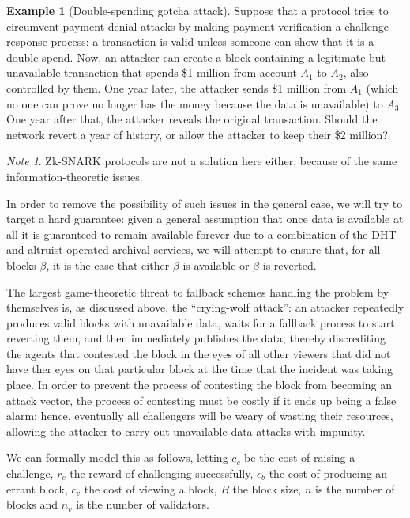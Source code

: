 \documentclass[11pt,a4paper]{report}
\theoremstyle{plain}
\theoremstyle{definition}
\newtheorem{exmp}{Example}[section]
\theoremstyle{remark}
\newtheorem*{note}{Note}
\begin{document}
\begin{exmp}[Double-spending gotcha attack]
Suppose that a protocol tries to circumvent payment-denial attacks by making payment verification a challenge-response process: a transaction is valid unless someone can show that it is a double-spend. Now, an attacker can create a block containing a legitimate but unavailable transaction that spends \$1 million from account $A_1$ to $A_2$, also controlled by them. One year later, the attacker sends \$1 million from $A_1$ (which no one can prove no longer has the money because the data is unavailable) to $A_3$. One year after that, the attacker reveals the original transaction. Should the network revert a year of history, or allow the attacker to keep their \$2 million?
\end{exmp}

\begin{note}
Zk-SNARK protocols are not a solution here either, because of the same information-theoretic issues.
\end{note}

In order to remove the possibility of such issues in the general case, we will try to target a hard guarantee: given a general assumption that once data is available at all it is guaranteed to remain available forever due to a combination of the DHT and altruist-operated archival services, we will attempt to ensure that, for all blocks $\beta$, it is the case that either $\beta$ is available or $\beta$ is reverted.

The largest game-theoretic threat to fallback schemes handling the problem by themselves is, as discussed above, the ``crying-wolf attack'': an attacker repeatedly produces valid blocks with unavailable data, waits for a fallback process to start reverting them, and then immediately publishes the data, thereby discrediting the agents that contested the block in the eyes of all other viewers that did not have ther eyes on that particular block at the time that the incident was taking place. In order to prevent the process of contesting the block from becoming an attack vector, the process of contesting must be costly if it ends up being a false alarm; hence, eventually all challengers will be weary of wasting their resources, allowing the attacker to carry out unavailable-data attacks with impunity.

We can formally model this as follows, letting $c_c$ be the cost of raising a challenge, $r_c$ the reward of challenging successfully, $c_b$ the cost of producing an errant block, $c_v$ the cost of viewing a block, $B$ the block size, $n$ is the number of blocks and $n_v$ is the number of validators. 
\end{document}
